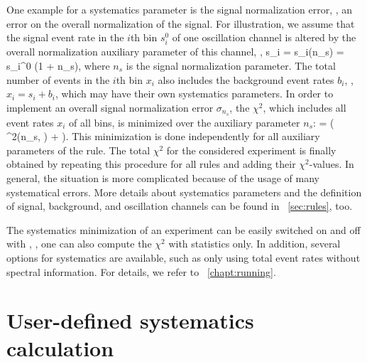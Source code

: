  One example for a systematics parameter is the signal normalization error, \ie, an error on the overall normalization of the signal. For illustration, we assume that the signal event rate in the $i$th bin $s_i^0$ of one oscillation channel is altered by the overall normalization auxiliary parameter of this channel, \ie , 
\be
 s_i = s_i(n_s) = s_i^0 \cdot (1 + n_s),
\ee
where $n_s$ is the signal normalization parameter. The total number of events in the $i$th bin $x_i$ also includes the background event rates $b_i$, \ie, $x_i = s_i + b_i$, which may have their own systematics parameters.
In order to implement an overall signal normalization error $\sigma_{n_s}$,  the $\chi^2$, which includes all event rates $x_i$ of all bins, is minimized over the auxiliary parameter $n_s$:
\be
  =  \left(  \chi^2(n_s, \hdots) +  \right).
\ee 
This minimization is done independently for all auxiliary parameters of the rule. The total $\chi^2$ for the considered experiment is finally obtained by repeating this procedure for all rules and adding their $\chi^2$-values. In general, the situation is more complicated because of the usage of many systematical errors. More details about systematics parameters and the definition of signal, background, and oscillation channels can be found in \Sec~\ref{sec:rules}, too.

The systematics minimization of an experiment can be easily switched on and off with , \ie, one can also compute the $\chi^2$ with statistics only. In addition, several options for 
systematics are available, such as only using total event rates without
spectral information. For details, we refer to \Chapt~\ref{chapt:running}.


\section{User-defined systematics calculation}
\label{sec:userchi}



